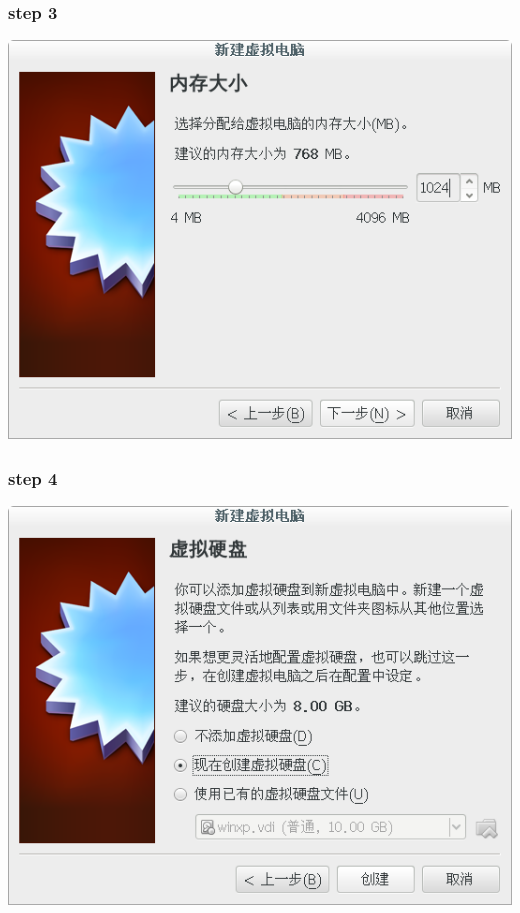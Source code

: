 \documentclass[xcolor=svgnames,presentation]{beamer}
\begin{document}
\begin{frame}
\frametitle{step 3}
\label{sec-1-3}

\begin{center}
\includegraphics[width=.9\linewidth]{img/vb05.png}
\end{center}
\end{frame}
\begin{frame}
\frametitle{step 4}
\label{sec-1-4}

\begin{center}
\includegraphics[width=.9\linewidth]{img/vb06.png}
\end{center}
\end{frame}
\end{document}
